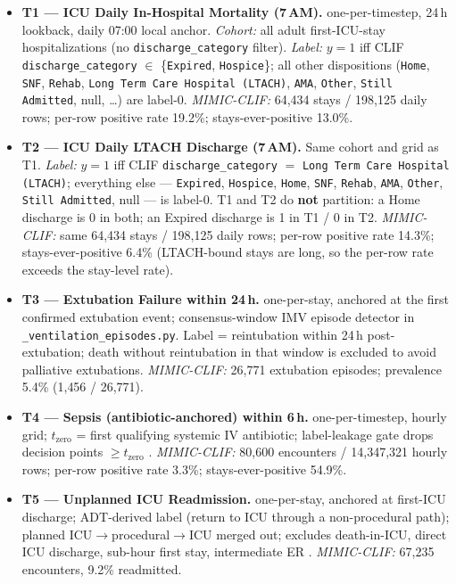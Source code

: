 \documentclass[11pt]{article}
\begin{document}
\begin{itemize}[leftmargin=1.5em]
  \item \textbf{T1 --- ICU Daily In-Hospital Mortality (7\,AM).}
        one-per-timestep, 24\,h lookback, daily 07:00 local anchor.
        \emph{Cohort:} all adult first-ICU-stay hospitalizations (no
        \texttt{discharge\_category} filter).
        \emph{Label:} $y=1$ iff CLIF \texttt{discharge\_category} $\in$
        \{\texttt{Expired}, \texttt{Hospice}\}; all other dispositions
        (\texttt{Home}, \texttt{SNF}, \texttt{Rehab},
        \texttt{Long Term Care Hospital (LTACH)}, \texttt{AMA},
        \texttt{Other}, \texttt{Still Admitted}, null, \ldots) are
        label-0.
        \emph{MIMIC-CLIF:} 64{,}434 stays / 198{,}125 daily rows;
        per-row positive rate 19.2\%; stays-ever-positive 13.0\%.
  \item \textbf{T2 --- ICU Daily LTACH Discharge (7\,AM).} Same cohort
        and grid as T1. \emph{Label:} $y=1$ iff CLIF
        \texttt{discharge\_category} $=$
        \texttt{Long Term Care Hospital (LTACH)}; everything else ---
        \texttt{Expired}, \texttt{Hospice}, \texttt{Home}, \texttt{SNF},
        \texttt{Rehab}, \texttt{AMA}, \texttt{Other},
        \texttt{Still Admitted}, null --- is label-0. T1 and T2 do
        \textbf{not} partition: a Home discharge is 0 in both; an
        Expired discharge is 1 in T1 / 0 in T2.
        \emph{MIMIC-CLIF:} same 64{,}434 stays / 198{,}125 daily rows;
        per-row positive rate 14.3\%; stays-ever-positive 6.4\%
        (LTACH-bound stays are long, so the per-row rate exceeds the
        stay-level rate).
  \item \textbf{T3 --- Extubation Failure within 24\,h.} one-per-stay,
        anchored at the first confirmed extubation event; consensus-window
        IMV episode detector in \texttt{\_ventilation\_episodes.py}.
        Label = reintubation within 24\,h post-extubation; death without
        reintubation in that window is excluded to avoid palliative extubations.
        \emph{MIMIC-CLIF:} 26{,}771 extubation episodes;
        prevalence 5.4\% (1{,}456 / 26{,}771).
  \item \textbf{T4 --- Sepsis (antibiotic-anchored) within 6\,h.}
        one-per-timestep, hourly grid; $t_{\text{zero}}$ = first qualifying
        systemic IV antibiotic; label-leakage gate drops decision points
        $\ge t_{\text{zero}}$ \citep{kamran2024sepsis}.
        \emph{MIMIC-CLIF:} 80{,}600 encounters / 14{,}347{,}321 hourly rows;
        per-row positive rate 3.3\%; stays-ever-positive 54.9\%.
  \item \textbf{T5 --- Unplanned ICU Readmission.} one-per-stay, anchored
        at first-ICU discharge; ADT-derived label (return to ICU through a
        non-procedural path); planned ICU$\to$procedural$\to$ICU merged out;
        excludes death-in-ICU, direct ICU discharge, sub-hour first stay,
        intermediate ER \citep{rojas2018readmission}.
        \emph{MIMIC-CLIF:} 67{,}235 encounters, 9.2\% readmitted.
\end{itemize}
\end{document}

